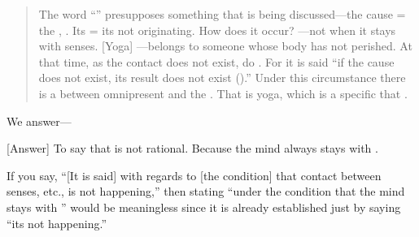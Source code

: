 \begin{quotation}
    The%
 word ``'' presupposes something that is being        discussed---the cause  = the  \atman, .  Its  = its not originating.  How does it occur?%
        ---not when it stays with senses.  [Yoga] ---belongs to someone whose body has not perished. At that time, as the contact does not exist,  do .   For it is said ``if the cause does not exist, its result does not exist ().''  Under this circumstance there is a  between omnipresent \bht{\atman} and the .  That is yoga, which is a specific  that .%
\end{quotation}

We%
 answer---

[Answer]%
 To say that  is not rational.  Because the mind always stays with \atman.
  
If%
 you say, ``[It is said] with regards to [the condition] that contact between senses, etc., is not happening,'' then stating ``under the condition that the mind
stays with \atman'' would be meaningless since it is already established
just by saying ``its not happening.''

